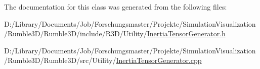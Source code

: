 The documentation for this class was generated from the following files\+:\begin{DoxyCompactItemize}
\item 
D\+:/\+Library/\+Documents/\+Job/\+Forschungsmaster/\+Projekte/\+Simulation\+Visualization/\+Rumble3\+D/\+Rumble3\+D/include/\+R3\+D/\+Utility/\mbox{\hyperlink{_inertia_tensor_generator_8h}{Inertia\+Tensor\+Generator.\+h}}\item 
D\+:/\+Library/\+Documents/\+Job/\+Forschungsmaster/\+Projekte/\+Simulation\+Visualization/\+Rumble3\+D/\+Rumble3\+D/src/\+Utility/\mbox{\hyperlink{_inertia_tensor_generator_8cpp}{Inertia\+Tensor\+Generator.\+cpp}}\end{DoxyCompactItemize}
